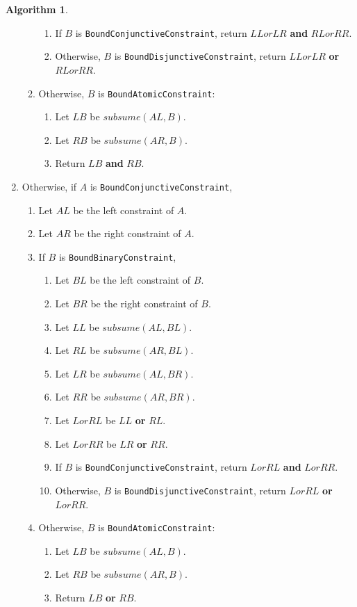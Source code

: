 \documentclass[a4paper,oneside,11pt]{book}
\theoremstyle{definition}
\newtheorem{algo}{Algorithm}[section]
\begin{document}
\begin{algo}
\begin{enumerate}
\begin{enumerate}
\begin{enumerate}
\item
If $B$ is \verb|BoundConjunctiveConstraint|, return $LLorLR$ \textbf{and} $RLorRR$.
\item
Otherwise, $B$ is \verb|BoundDisjunctiveConstraint|, return $LLorLR$ \textbf{or} $RLorRR$.
\end{enumerate}
\item
Otherwise, $B$ is \verb|BoundAtomicConstraint|:
\begin{enumerate}
\item
Let $LB$ be $subsume(AL, B)$.
\item
Let $RB$ be $subsume(AR, B)$.
\item
Return $LB$ \textbf{and} $RB$.
\end{enumerate}
\end{enumerate}
\item
Otherwise, if $A$ is \verb|BoundConjunctiveConstraint|,
\begin{enumerate}
\item
Let $AL$ be the left constraint of $A$.
\item
Let $AR$ be the right constraint of $A$.
\item
If $B$ is \verb|BoundBinaryConstraint|,
\begin{enumerate}
\item
Let $BL$ be the left constraint of $B$.
\item
Let $BR$ be the right constraint of $B$.
\item
Let $LL$ be $subsume(AL, BL)$.
\item
Let $RL$ be $subsume(AR, BL)$.
\item
Let $LR$ be $subsume(AL, BR)$.
\item
Let $RR$ be $subsume(AR, BR)$.
\item
Let $LorRL$ be $LL$ \textbf{or} $RL$.
\item
Let $LorRR$ be $LR$ \textbf{or} $RR$.
\item
If $B$ is \verb|BoundConjunctiveConstraint|, return $LorRL$ \textbf{and} $LorRR$.
\item
Otherwise, $B$ is \verb|BoundDisjunctiveConstraint|, return $LorRL$ \textbf{or} $LorRR$.
\end{enumerate}
\item
Otherwise, $B$ is \verb|BoundAtomicConstraint|:
\begin{enumerate}
\item
Let $LB$ be $subsume(AL, B)$.
\item
Let $RB$ be $subsume(AR, B)$.
\item
Return $LB$ \textbf{or} $RB$.
\end{enumerate}
\end{enumerate}
\end{enumerate}
\end{algo}
\end{document}
